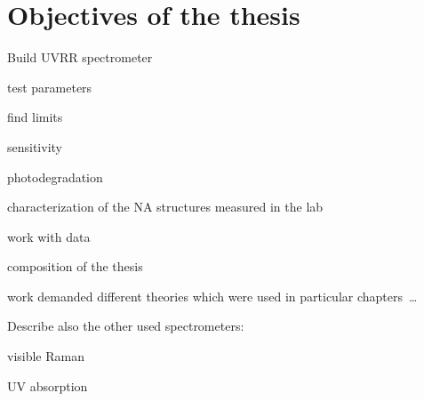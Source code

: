 \chapter{Objectives of the thesis}

\begin{docitemize}
	\item Build UVRR spectrometer
	\item test parameters
	\item find limits
	\item sensitivity
	\item photodegradation
	\item characterization of the NA structures measured in the lab
	\item work with data
	\item composition of the thesis
	\item work demanded different theories which were used in particular
		chapters~\ldots
\end{docitemize}

Describe also the other used spectrometers:

\begin{docitemize}
	\item visible Raman
	\item UV absorption
\end{docitemize}
